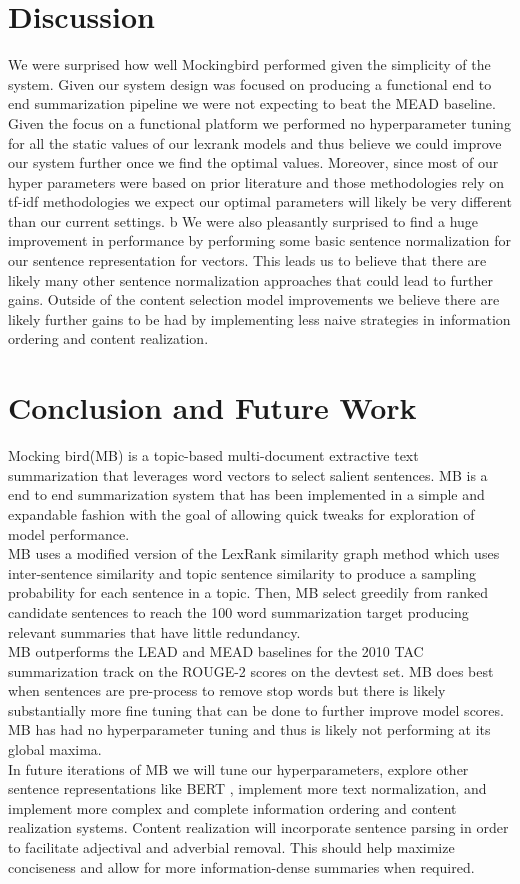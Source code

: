 \documentclass[11pt,a4paper]{article}
\begin{document}
\section{Discussion}
We were surprised how well Mockingbird performed given the simplicity of the system. Given our system design was focused on producing a functional end to end summarization pipeline we were not expecting to beat the MEAD baseline. Given the focus on a functional platform we performed no hyperparameter tuning for all the static values of our lexrank models and thus believe we could improve our system further once we find the optimal values. Moreover, since most of our hyper parameters were based on prior literature and those methodologies rely on tf-idf methodologies we expect our optimal parameters will likely be very different than our current settings.  b We were also pleasantly surprised to find a huge improvement in performance by performing some basic sentence normalization for our sentence representation for vectors. This leads us to believe that there are likely many other sentence normalization approaches that could lead to further gains.  Outside of the content selection model improvements we believe there are likely further gains to be had by implementing less naive strategies in information ordering and content realization. 
\section{Conclusion and Future Work}
Mocking bird(MB) is a topic-based multi-document extractive text summarization that leverages word vectors to select salient sentences. MB is a end to end summarization system that has been implemented in a simple and expandable fashion with the goal of allowing quick tweaks for exploration of model performance. \\
MB uses a modified version of the LexRank similarity graph method which uses inter-sentence similarity and topic sentence similarity to produce a sampling probability for each sentence in a topic. Then, MB select greedily from ranked candidate sentences to reach the 100 word summarization target producing relevant summaries that have little redundancy. \\
MB outperforms the LEAD and MEAD baselines for the 2010 TAC summarization track on the ROUGE-2 scores on the devtest set. MB does best when sentences are pre-process to remove stop words but there is likely substantially more fine tuning that can be done to further improve model scores. MB has had no hyperparameter tuning and thus is likely not performing at its global maxima. \\
In future iterations of MB we will tune our hyperparameters, explore other sentence representations like BERT \cite{Devlin2019BERTPO}, implement more text normalization, and implement more complex and complete information ordering and content realization systems.
Content realization will incorporate sentence parsing in order to facilitate adjectival and adverbial removal. This should help maximize conciseness and allow for more information-dense summaries when required.


\end{document}

